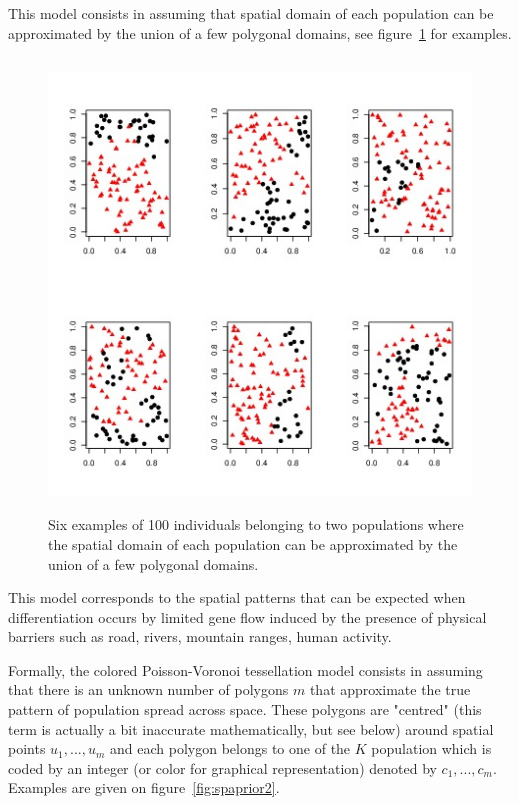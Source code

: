 \documentclass[a4paper,10pt]{article}
\begin{document}
This model consists in assuming that spatial domain of each population can be approximated by the union of a few polygonal domains, 
see figure~\ref{fig:spaprior} for examples. 

\begin{figure}[h]
\includegraphics[height=12cm,width=17cm]{./fig/example_spatial2_bis.jpeg}
\caption{Six examples of 100 individuals belonging to two populations  where the 
spatial domain of each population can be approximated by the union of a few polygonal domains. }\label{fig:spaprior}
\end{figure}


This model corresponds to the spatial patterns that can be expected when differentiation occurs by limited gene flow induced by the presence 
of physical barriers such as road, rivers, mountain ranges, human activity.

Formally, the colored Poisson-Voronoi tessellation model consists in assuming that there is an unknown number of polygons $m$ 
that approximate the true pattern of population spread across space. 
These polygons are "centred" (this term is actually a bit inaccurate mathematically, but see below) around spatial points 
$u_1,...,u_m$ and each polygon belongs to one of the $K$ population which is coded by an integer (or color for graphical representation) 
denoted by $c_1,...,c_m$. Examples are given on figure~\ref{fig:spaprior2}. 
\end{document}
